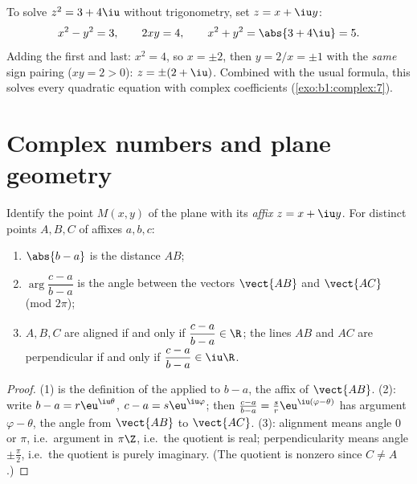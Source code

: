 \begin{example}\label{ex:b1:complex:sqrt}
To solve $z^2 = 3 + 4\iu$ without trigonometry, set $z = x + \iu y$:
\[
x^2 - y^2 = 3, \qquad 2xy = 4, \qquad x^2 + y^2 = \abs{3 + 4\iu} = 5 .
\]
Adding the first and last: $x^2 = 4$, so $x = \pm 2$, then $y = 2/x =
\pm 1$ with the \emph{same} sign pairing ($xy = 2 > 0$): $z = \pm(2 +
\iu)$. Combined with the usual formula, this solves every quadratic
equation with complex coefficients
(\cref{exo:b1:complex:7}).
\end{example}

\section{Complex numbers and plane geometry}

\begin{proposition}\label{prop:b1:complex:geometry}
Identify the point $M(x, y)$ of the plane with its \emph{affix} $z = x
+ \iu y$. For distinct points $A, B, C$ of affixes $a, b,
c$:
\begin{enumerate}
  \item $\abs{b - a}$ is the distance $AB$;
  \item $\arg\dfrac{c - a}{b - a}$ is the angle between the vectors
        $\vect{AB}$ and $\vect{AC}$ (mod $2\pi$);
  \item $A, B, C$ are aligned if and only if $\dfrac{c - a}{b - a} \in
        \R$; the lines $AB$ and $AC$ are perpendicular if and only if
        $\dfrac{c - a}{b - a} \in \iu\R$.
\end{enumerate}
\end{proposition}

\begin{proof}
(1) is the definition of the  applied to $b - a$, the affix of
$\vect{AB}$. (2): write $b - a = r\eu^{\iu\theta}$, $c - a =
s\eu^{\iu\varphi}$; then $\frac{c-a}{b-a} = \frac sr
\eu^{\iu(\varphi - \theta)}$ has argument $\varphi - \theta$, the
angle from $\vect{AB}$ to $\vect{AC}$. (3): alignment means angle $0$
or $\pi$, i.e.\ argument in $\pi\Z$, i.e.\ the quotient is real;
perpendicularity means angle $\pm\frac\pi2$, i.e.\ the quotient is
purely imaginary. (The quotient is nonzero since $C \neq A$.)
\end{proof}

